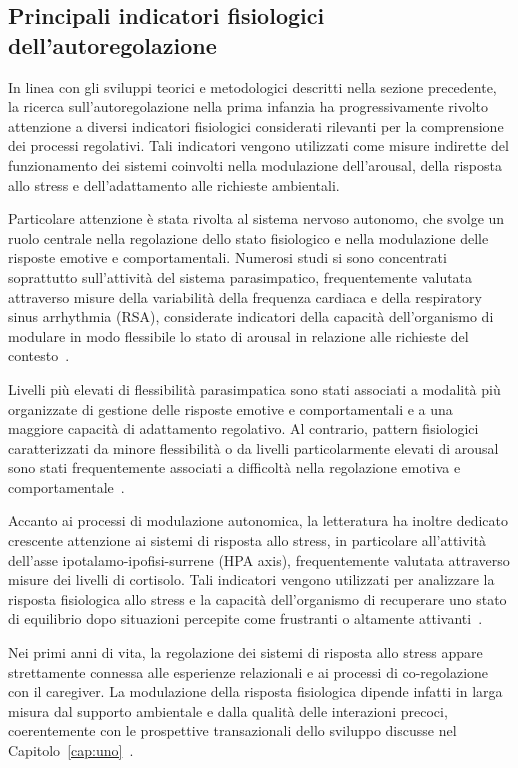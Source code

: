         \subsection{Principali indicatori fisiologici dell'autoregolazione}
        \label{sec:3_3_2}

            In linea con gli sviluppi teorici e metodologici descritti nella sezione precedente, la ricerca sull'autoregolazione nella prima infanzia ha progressivamente rivolto attenzione a diversi indicatori fisiologici considerati rilevanti per la comprensione dei processi regolativi. Tali indicatori vengono utilizzati come misure indirette del funzionamento dei sistemi coinvolti nella modulazione dell'arousal, della risposta allo stress e dell'adattamento alle richieste ambientali.

            Particolare attenzione è stata rivolta al sistema nervoso autonomo, che svolge un ruolo centrale nella regolazione dello stato fisiologico e nella modulazione delle risposte emotive e comportamentali. Numerosi studi si sono concentrati soprattutto sull'attività del sistema parasimpatico, frequentemente valutata attraverso misure della variabilità della frequenza cardiaca e della respiratory sinus arrhythmia (RSA), considerate indicatori della capacità dell'organismo di modulare in modo flessibile lo stato di arousal in relazione alle richieste del contesto~\cite{calkins2007hill,beauchaine2015}.

            Livelli più elevati di flessibilità parasimpatica sono stati associati a modalità più organizzate di gestione delle risposte emotive e comportamentali e a una maggiore capacità di adattamento regolativo. Al contrario, pattern fisiologici caratterizzati da minore flessibilità o da livelli particolarmente elevati di arousal sono stati frequentemente associati a difficoltà nella regolazione emotiva e comportamentale~\cite{beauchaine2019}.

            Accanto ai processi di modulazione autonomica, la letteratura ha inoltre dedicato crescente attenzione ai sistemi di risposta allo stress, in particolare all'attività dell'asse ipotalamo-ipofisi-surrene (HPA axis), frequentemente valutata attraverso misure dei livelli di cortisolo. Tali indicatori vengono utilizzati per analizzare la risposta fisiologica allo stress e la capacità dell'organismo di recuperare uno stato di equilibrio dopo situazioni percepite come frustranti o altamente attivanti~\cite{blair2010,blair2015}.

            Nei primi anni di vita, la regolazione dei sistemi di risposta allo stress appare strettamente connessa alle esperienze relazionali e ai processi di co-regolazione con il caregiver. La modulazione della risposta fisiologica dipende infatti in larga misura dal supporto ambientale e dalla qualità delle interazioni precoci, coerentemente con le prospettive transazionali dello sviluppo discusse nel Capitolo~\ref{cap:uno}~\cite{sameroff2009,calkins2007hill}.

